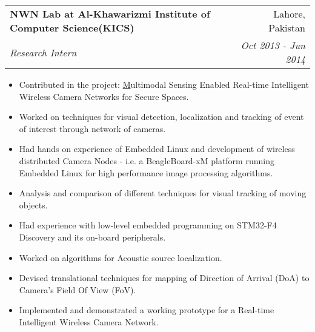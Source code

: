 \documentclass[letterpaper,11pt]{article}
\makeatletter
\newcommand{\resumeItem}[2]{
  \item\small{
    \textbf{#1}{#2 \vspace{-2pt}}
  }
}
\newcommand{\resumeSubheading}[4]{
  \vspace{-1pt}\item
    \begin{tabular*}{0.97\textwidth}{l@{\extracolsep{\fill}}r}
      \textbf{#1} & #2 \\
      \textit{\small#3} & \textit{\small #4} \\
    \end{tabular*}\vspace{-5pt}
}
\newcommand{\resumeItemListStart}{\begin{itemize}}
\newcommand{\resumeItemListEnd}{\end{itemize}\vspace{-5pt}}
\makeatother
\begin{document}
    \resumeSubheading
      {NWN Lab at Al-Khawarizmi Institute of Computer Science(KICS)}{Lahore, Pakistan}
      {Research Intern}{Oct 2013 - Jun 2014} 
      \resumeItemListStart
        \resumeItem{}
          {Contributed in the project: \href{https://www.ignite.org.pk/component/tprojects/project/22.html} Multimodal Sensing Enabled Real-time Intelligent Wireless Camera Networks for Secure Spaces.}
        \resumeItem{}
          {Worked on techniques for visual detection, localization and tracking of event of interest through network of cameras.}
        \resumeItem{}
          {Had hands on experience of Embedded Linux and development of wireless distributed Camera Nodes - i.e. a BeagleBoard-xM platform running Embedded Linux for high performance image processing algorithms.}
        \resumeItem{}
          {Analysis and comparison of different techniques for visual tracking of moving objects.}
        \resumeItem{}
          {Had experience with low-level embedded programming on STM32-F4 Discovery and its on-board peripherals.}
        \resumeItem{}
          {Worked on algorithms for Acoustic source localization.}
        \resumeItem{}
          {Devised translational techniques for mapping of Direction of Arrival (DoA) to Camera’s Field Of View (FoV).}
        \resumeItem{}
          {Implemented and demonstrated a working prototype for a Real-time Intelligent Wireless Camera Network.}
          


      \resumeItemListEnd

\end{document}
